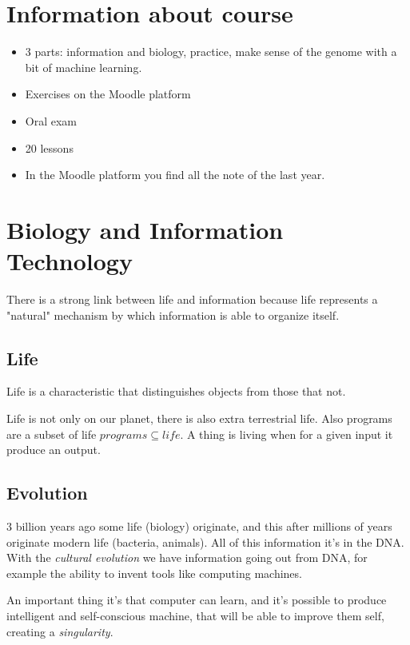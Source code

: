 \section{Information about course}

\begin{itemize}
  \item 3 parts: information and biology, practice, make sense of the genome
with a bit of machine learning.
  \item Exercises on the Moodle platform
  \item Oral exam
  \item 20 lessons
  \item In the Moodle platform you find all the note of the last year.
\end{itemize}

\section{Biology and Information Technology}

There is a strong link between life and information because life represents a
"natural" mechanism by which information is able to organize itself.

\subsection{Life}
Life is a characteristic that distinguishes objects from those that not.

Life is not only on our planet, there is also extra terrestrial life.
Also programs are a subset of life $programs \subseteq life$. A thing is living
when for a given input it produce an output.

\subsection{Evolution}

3 billion years ago some life (biology) originate, and this after millions of
years originate modern life (bacteria, animals). All of this information it's
in the DNA. With the \textit{cultural evolution} we have information going out
from DNA, for example the ability to invent tools like computing machines.

An important thing it's that computer can learn, and it's possible to produce
intelligent and self-conscious machine, that will be able to improve them self,
creating a \textit{singularity}.

